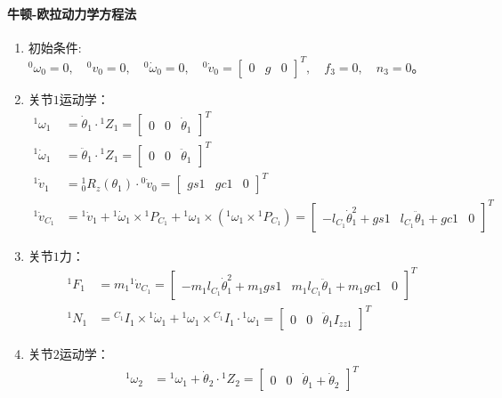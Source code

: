 \documentclass[
12pt, %
a4paper, 
oneside, %
]{scrartcl}
\begin{document}
{\paragraph{牛顿-欧拉动力学方程法}
\begin{enumerate}
\item 初始条件: $ {}^0 \omega_0 = 0, \quad {}^0 v_0 = 0, \quad {}^0 \dot{\omega}_0 = 0, \quad {}^0 \dot{v}_0 = \begin{bmatrix} 0 & g & 0 \end{bmatrix}^T, \quad f_3 = 0, \quad n_3 = 0 $。
\item 关节$ 1 $运动学：
\begin{align*}
{}^1 \omega_1 &= \dot{\theta}_1 \cdot {}^1 Z_1 = \begin{bmatrix} 0 & 0 & \dot{\theta}_1 \end{bmatrix}^T \\
{}^1 \dot{\omega}_1 &= \ddot{\theta}_1 \cdot {}^1 Z_1 = \begin{bmatrix} 0 & 0 & \ddot{\theta}_1 \end{bmatrix}^T \\
{}^1 \dot{v}_1 &= {}^1_0 R_z(\theta_1) \cdot {}^0 \dot{v}_0 = \begin{bmatrix} gs1 & gc1 & 0 \end{bmatrix}^T \\
{}^1 \dot{v}_{C_1} &= {}^1 \dot{v}_1 + {}^1 \dot{\omega}_1 \times {}^1 P_{C_1} + {}^1 \omega_1 \times ({}^1 \omega_1 \times {}^1 P_{C_1}) = \begin{bmatrix} -l_{C_1} \dot{\theta}_1^2 + gs1 & l_{C_1} \ddot{\theta}_1 + gc1 & 0 \end{bmatrix}^T
\end{align*}
\item 关节$ 1 $力：
\begin{align*}
{}^1 F_1 &= m_1 {}^1\dot{v}_{C_1} = \begin{bmatrix} -m_1 l_{C_1} \dot{\theta}_1^2 + m_1 gs1 & m_1 l_{C_1} \ddot{\theta}_1 + m_1 gc1 & 0 \end{bmatrix}^T \\
{}^1 N_1 &= {}^{C_1}I_1 \times {}^1 \dot{\omega}_1 + {}^1 \omega_1 \times {}^{C_1}I_1 \cdot {}^1 \omega_1 = \begin{bmatrix} 0 & 0 & \ddot{\theta}_1 I_{zz1} \end{bmatrix}^T
\end{align*}
\item 关节$ 2 $运动学：
\begin{align*}
{}^1 \omega_2 &= {}^1 \omega_1 + \dot{\theta}_2 \cdot {}^1 Z_2 = \begin{bmatrix} 0 & 0 & \dot{\theta}_1 + \dot{\theta}_2 \end{bmatrix}^T \\

\end{align*}
\end{enumerate}}
\end{document}
